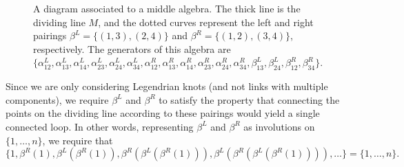 \documentclass[a4paper,final, reqno]{amsart}
\theoremstyle{plain}
\theoremstyle{definition}
\begin{document}
	
	
	\begin{figure}
		\caption[A diagram associated to a middle algebra]{A diagram associated to a middle algebra. The thick line is the dividing line $M$, and the dotted curves represent the left and right pairings $\beta^L = \{(1,3),(2,4)\}$ and $\beta^R=\{(1,2),(3,4)\}$, respectively. The generators of this algebra are $\{\alpha_{12}^L, \alpha_{13}^L, \alpha_{14}^L, \alpha_{23}^L, \alpha_{24}^L, \alpha_{34}^L, \alpha_{12}^R, \alpha_{13}^R, \alpha_{14}^R, \alpha_{23}^R, \alpha_{24}^R, \alpha_{34}^R, \beta_{13}^L, \beta_{24}^L, \beta_{12}^R, \beta_{34}^R\}$. }\label{fig:midalg}
	\end{figure}
	
	
	Since we are only considering Legendrian knots (and not links with multiple components), we require $\beta^L$ and $\beta^R$ to satisfy the property that connecting the points on the dividing line according to these pairings would yield a single connected loop. In other words, representing $\beta^L$ and $\beta^R$ as involutions on $\{1,\dots, n\}$, we require that 
	\begin{equation} \label{pairingknotcondition}
		\{1, \beta^R(1), \beta^L(\beta^R(1)), \beta^R(\beta^L(\beta^R(1))), \beta^L(\beta^R(\beta^L(\beta^R(1)))), \dots\} = \{1,\dots, n\}.
	\end{equation} 
	
\end{document}
